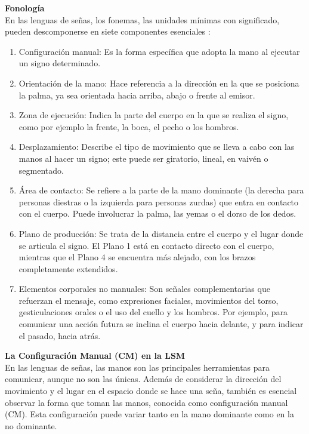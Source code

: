\textbf{Fonología}\\
En las lenguas de señas, los fonemas, las unidades mínimas con significado, pueden descomponerse en siete componentes esenciales \cite{ref39}:

\begin{enumerate}
    \item Configuración manual: Es la forma específica que adopta la mano al ejecutar un signo determinado.
    \item Orientación de la mano: Hace referencia a la dirección en la que se posiciona la palma, ya sea orientada hacia arriba, abajo o frente al emisor.
    \item Zona de ejecución: Indica la parte del cuerpo en la que se realiza el signo, como por ejemplo la frente, la boca, el pecho o los hombros.
    \item Desplazamiento: Describe el tipo de movimiento que se lleva a cabo con las manos al hacer un signo; este puede ser giratorio, lineal, en vaivén o segmentado.
    \item Área de contacto: Se refiere a la parte de la mano dominante (la derecha para personas diestras o la izquierda para personas zurdas) que entra en contacto con el cuerpo. Puede involucrar la palma, las yemas o el dorso de los dedos.
    \item Plano de producción: Se trata de la distancia entre el cuerpo y el lugar donde se articula el signo. El Plano 1 está en contacto directo con el cuerpo, mientras que el Plano 4 se encuentra más alejado, con los brazos completamente extendidos.
    \item Elementos corporales no manuales: Son señales complementarias que refuerzan el mensaje, como expresiones faciales, movimientos del torso, gesticulaciones orales o el uso del cuello y los hombros. Por ejemplo, para comunicar una acción futura se inclina el cuerpo hacia delante, y para indicar el pasado, hacia atrás.\\
\end{enumerate}

\textbf{La Configuración Manual (CM) en la LSM}\\
En las lenguas de señas, las manos son las principales herramientas para comunicar, aunque no son las únicas. Además de considerar la dirección del movimiento y el lugar en el espacio donde se hace una seña, también es esencial observar la forma que toman las manos, conocida como configuración manual (CM). Esta configuración puede variar tanto en la mano dominante como en la no dominante.\\


